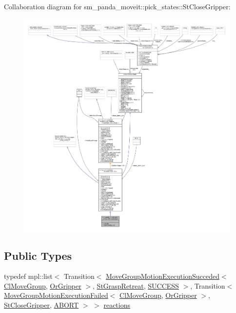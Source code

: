Collaboration diagram for sm\+\_\+panda\+\_\+moveit\+:\+:pick\+\_\+states\+:\+:St\+Close\+Gripper\+:
\nopagebreak
\begin{figure}[H]
\begin{center}
\leavevmode
\includegraphics[width=350pt]{structsm__panda__moveit_1_1pick__states_1_1StCloseGripper__coll__graph}
\end{center}
\end{figure}
\subsection*{Public Types}
\begin{DoxyCompactItemize}
\item 
typedef mpl\+::list$<$ Transition$<$ \hyperlink{structmoveit__z__client_1_1MoveGroupMotionExecutionSucceded}{Move\+Group\+Motion\+Execution\+Succeded}$<$ \hyperlink{classmoveit__z__client_1_1ClMoveGroup}{Cl\+Move\+Group}, \hyperlink{classsm__panda__moveit_1_1OrGripper}{Or\+Gripper} $>$, \hyperlink{structsm__panda__moveit_1_1pick__states_1_1StGraspRetreat}{St\+Grasp\+Retreat}, \hyperlink{classSUCCESS}{S\+U\+C\+C\+E\+SS} $>$, Transition$<$ \hyperlink{structmoveit__z__client_1_1MoveGroupMotionExecutionFailed}{Move\+Group\+Motion\+Execution\+Failed}$<$ \hyperlink{classmoveit__z__client_1_1ClMoveGroup}{Cl\+Move\+Group}, \hyperlink{classsm__panda__moveit_1_1OrGripper}{Or\+Gripper} $>$, \hyperlink{structsm__panda__moveit_1_1pick__states_1_1StCloseGripper}{St\+Close\+Gripper}, \hyperlink{classABORT}{A\+B\+O\+RT} $>$ $>$ \hyperlink{structsm__panda__moveit_1_1pick__states_1_1StCloseGripper_af40cf0da3fc0139b082a1f892a616dc6}{reactions}
\end{DoxyCompactItemize}
